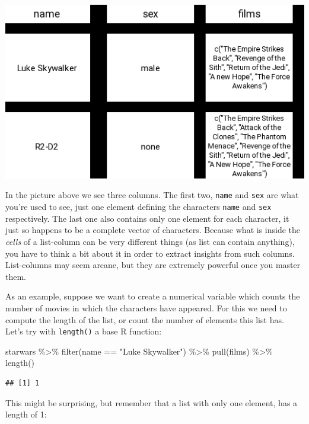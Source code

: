 \documentclass[
]{article}
\newenvironment{Shaded}{\begin{snugshade}}{\end{snugshade}}
\newcommand{\FunctionTok}[1]{\textcolor[rgb]{0.00,0.00,0.00}{#1}}
\newcommand{\NormalTok}[1]{#1}
\newcommand{\SpecialCharTok}[1]{\textcolor[rgb]{0.00,0.00,0.00}{#1}}
\newcommand{\StringTok}[1]{\textcolor[rgb]{0.31,0.60,0.02}{#1}}
\begin{document}
\includegraphics[width=6.47in]{assets/zoom_list_columns}

In the picture above we see three columns. The first two, \texttt{name} and \texttt{sex} are what you're used
to see, just one element defining the characters \texttt{name} and \texttt{sex} respectively. The last one
also contains only one element for each character, it just so happens to be a complete
vector of characters. Because what is inside the \emph{cells} of a list-column can be very different
things (as list can contain anything), you have to think a bit about it in order to extract
insights from such columns. List-columns may seem arcane, but they are extremely powerful
once you master them.

As an example, suppose we want to create a numerical variable which counts the number of movies
in which the characters have appeared. For this we need to compute the length of the list, or count
the number of elements this list has. Let's try with \texttt{length()} a base R function:

\begin{Shaded}
\begin{Highlighting}[]
\NormalTok{starwars }\SpecialCharTok{\%\textgreater{}\%}
  \FunctionTok{filter}\NormalTok{(name }\SpecialCharTok{==} \StringTok{"Luke Skywalker"}\NormalTok{) }\SpecialCharTok{\%\textgreater{}\%}
  \FunctionTok{pull}\NormalTok{(films) }\SpecialCharTok{\%\textgreater{}\%}
  \FunctionTok{length}\NormalTok{()}
\end{Highlighting}
\end{Shaded}

\begin{verbatim}
## [1] 1
\end{verbatim}

This might be surprising, but remember that a list with only one element, has a length of 1:
\end{document}
